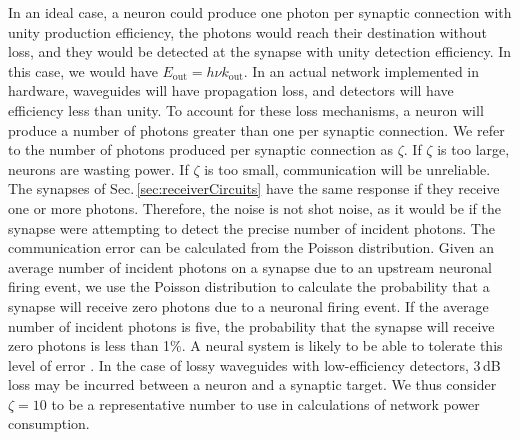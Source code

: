 \documentclass[aip,amsmath,amssymb,reprint,nofootinbib]{revtex4-1}
\begin{document}
In an ideal case, a neuron could produce one photon per synaptic connection with unity production efficiency, the photons would reach their destination without loss, and they would be detected at the synapse with unity detection efficiency. In this case, we would have $E_{\mathrm{out}} = h\nu k_{\mathrm{out}}$. In an actual network implemented in hardware, waveguides will have propagation loss, and detectors will have efficiency less than unity. To account for these loss mechanisms, a neuron will produce a number of photons greater than one per synaptic connection. We refer to the number of photons produced per synaptic connection as $\zeta$. If $\zeta$ is too large, neurons are wasting power. If $\zeta$ is too small, communication will be unreliable. The synapses of Sec.\,\ref{sec:receiverCircuits} have the same response if they receive one or more photons. Therefore, the noise is not shot noise, as it would be if the synapse were attempting to detect the precise number of incident photons. The communication error can be calculated from the Poisson distribution. Given an average number of incident photons on a synapse due to an upstream neuronal firing event, we use the Poisson distribution to calculate the probability that a synapse will receive zero photons due to a neuronal firing event. If the average number of incident photons is five, the probability that the synapse will receive zero photons is less than 1\%. A neural system is likely to be able to tolerate this level of error \cite{stgo2005}. In the case of lossy waveguides with low-efficiency detectors, 3\,dB loss may be incurred between a neuron and a synaptic target. We thus consider $\zeta = 10$ to be a representative number to use in calculations of network power consumption.
\end{document}
